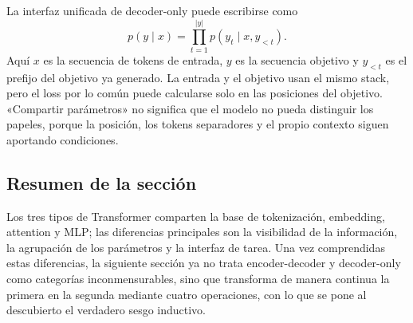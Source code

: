 La interfaz unificada de decoder-only puede escribirse como
\[
p(y\mid x)=\prod_{t=1}^{|y|}p(y_t\mid x,y_{<t}).
\]
Aquí $x$ es la secuencia de tokens de entrada, $y$ es la secuencia objetivo y $y_{<t}$ es el prefijo del objetivo ya generado. La entrada y el objetivo usan el mismo stack, pero el loss por lo común puede calcularse solo en las posiciones del objetivo. «Compartir parámetros» no significa que el modelo no pueda distinguir los papeles, porque la posición, los tokens separadores y el propio contexto siguen aportando condiciones.

\subsection{Resumen de la sección}

Los tres tipos de Transformer comparten la base de tokenización, embedding, attention y MLP; las diferencias principales son la visibilidad de la información, la agrupación de los parámetros y la interfaz de tarea. Una vez comprendidas estas diferencias, la siguiente sección ya no trata encoder-decoder y decoder-only como categorías inconmensurables, sino que transforma de manera continua la primera en la segunda mediante cuatro operaciones, con lo que se pone al descubierto el verdadero sesgo inductivo.
